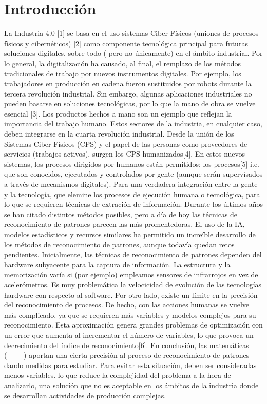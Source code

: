 \documentclass{article}
\begin{document}
\section{Introducción}
La Industria 4.0 [1] se basa en el uso sistemas Ciber-Físicos (uniones de procesos físicos y cibernéticos) [2] como componente tecnológica principal para futuras soluciones digitales, sobre todo  ( pero no únicamente) en el ámbito industrial. Por lo general, la digitalización ha causado, al final, el remplazo de los métodos tradicionales de trabajo por nuevos instrumentos digitales.
Por ejemplo, los trabajadores en producción en cadena fueron sustituidos por robots durante la tercera revolución industrial.
Sin embargo, algunas aplicaciones industriales no pueden basarse en soluciones tecnológicas, por lo que la mano de obra se vuelve esencial [3].  Los productos hechos a mano son un ejemplo que reflejan la importancia del trabajo humano. Estos sectores de la industria, en cualquier caso, deben integrarse en la cuarta revolución industrial. Desde la unión de los Sistemas Ciber-Físicos (CPS) y el papel de las personas como proveedores de servicios (trabajos activos), surgen los CPS humanizados[4]. En estos nuevos sistemas, los procesos dirigidos por humanos están permitidos; los procesos[5] i.e. que son conocidos, ejecutados y controlados por gente (aunque serán supervisados a través de mecanismos digitales).
Para una verdadera integración entre la gente y la tecnología, que elemine los procesos de ejecución humana o tecnológica, para lo que se requieren técnicas de extración de información. Durante los últimos años se han citado distintos métodos posibles, pero a día de hoy las técnicas de reconocimiento de patrones parecen las más promentedoras.
El uso de la IA, modelos estadísticos y recursos similares ha permitido un increíble desarrollo de los métodos de reconocimiento de patrones, aunque todavía quedan retos pendientes.
Inicialmente, las técnicas de reconocimiento de patrones dependen del hardware subyacente para la captura de información. La estructura y la memorización varía si (por ejemplo)   empleamos sensores de infrarrojos en vez de acelerómetros. Es muy problemática la velocicidad de evolución de las tecnologías hardware con respecto al software.
Por otro lado, existe un límite en la precisión del reconocimiento de procesos. De hecho, con las acciones humanas se vuelve más complicado, ya que se requieren más variables y modelos complejos para su reconocimiento. Esta aproximación genera grandes problemas de optimización con un error que aumenta al incrementar el número de variables, lo que provoca un decrecimiento del índice de reconocimiento[6]. En conclusión, las matemáticas (-------) aportan una cierta precisión al proceso de reconocimiento de patrones dando medidas para estudiar. Para evitar esta situación, deben ser consideradas menos variables. lo que reduce la complejidad del problema a la hora de analizarlo, una solución que no es aceptable en los ámbitos de la industria donde se desarrollan actividades de producción complejas.
\end{document}
